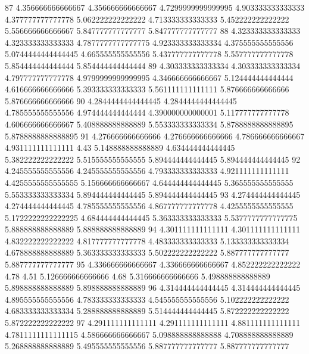87 4.356666666666667 4.356666666666667 4.7299999999999995 4.903333333333333 4.377777777777778 5.062222222222222 4.713333333333333 5.452222222222222 5.556666666666667 5.847777777777777 5.847777777777777
88 4.323333333333333 4.323333333333333 4.7877777777777775 4.923333333333334 4.375555555555556 5.0744444444444445 4.665555555555556 5.437777777777778 5.557777777777778 5.854444444444444 5.854444444444444
89 4.303333333333334 4.303333333333334 4.797777777777778 4.9799999999999995 4.346666666666667 5.124444444444444 4.616666666666666 5.393333333333333 5.561111111111111 5.876666666666666 5.876666666666666
90 4.2844444444444445 4.2844444444444445 4.785555555555556 4.974444444444444 4.390000000000001 5.117777777777778 4.606666666666667 5.408888888888889 5.553333333333334 5.8788888888888895 5.8788888888888895
91 4.276666666666666 4.276666666666666 4.786666666666667 4.931111111111111 4.43 5.148888888888889 4.634444444444445 5.382222222222222 5.515555555555555 5.894444444444445 5.894444444444445
92 4.245555555555556 4.245555555555556 4.793333333333333 4.921111111111111 4.4255555555555555 5.156666666666667 4.644444444444445 5.365555555555555 5.553333333333334 5.894444444444445 5.894444444444445
93 4.274444444444445 4.274444444444445 4.785555555555556 4.867777777777778 4.4255555555555555 5.1722222222222225 4.684444444444445 5.363333333333333 5.5377777777777775 5.888888888888889 5.888888888888889
94 4.301111111111111 4.301111111111111 4.832222222222222 4.817777777777778 4.483333333333333 5.133333333333334 4.678888888888889 5.363333333333333 5.502222222222222 5.887777777777777 5.887777777777777
95 4.336666666666667 4.336666666666667 4.852222222222222 4.78 4.51 5.126666666666666 4.68 5.316666666666666 5.498888888888889 5.898888888888889 5.898888888888889
96 4.314444444444445 4.314444444444445 4.895555555555556 4.783333333333333 4.545555555555556 5.102222222222222 4.683333333333334 5.288888888888889 5.514444444444445 5.872222222222222 5.872222222222222
97 4.291111111111111 4.291111111111111 4.881111111111111 4.7811111111111115 4.586666666666667 5.098888888888888 4.708888888888889 5.268888888888889 5.495555555555556 5.887777777777777 5.887777777777777